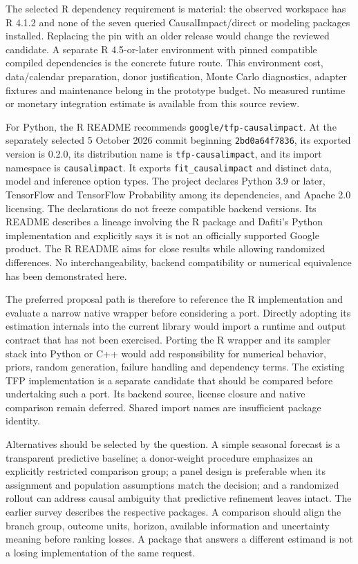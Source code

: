 The selected R dependency requirement is material: the observed workspace
has R 4.1.2 and none of the seven queried CausalImpact/direct or modeling
packages installed. Replacing the pin with an older release would change
the reviewed candidate. A separate R 4.5-or-later environment with pinned
compatible compiled dependencies is the concrete future route. This
environment cost, data/calendar preparation, donor justification, Monte
Carlo diagnostics, adapter fixtures and maintenance belong in the prototype
budget. No measured runtime or monetary integration estimate is available
from this source review. \citep{exec13_ci_reuse,exec13_ci_dependencies}

For Python, the R README recommends \texttt{google/tfp-causalimpact}.
At the separately selected 5 October 2026 commit beginning
\texttt{2bd0a64f7836}, its exported version is 0.2.0, its distribution name
is \texttt{tfp-causalimpact}, and its import namespace is
\texttt{causalimpact}. It exports \texttt{fit\_causalimpact} and distinct
data, model and inference option types. The project declares Python 3.9 or
later, TensorFlow and TensorFlow Probability among its dependencies, and
Apache 2.0 licensing. The declarations do not freeze compatible backend
versions. Its README describes a lineage involving the R package and Dafiti's
Python implementation and explicitly says it is not an officially supported
Google product. The R README aims for close results while allowing
randomized differences. No interchangeability, backend compatibility or
numerical equivalence has been demonstrated here.
\citep{exec13_ci_python,exec13_ci_r}

The preferred proposal path is therefore to reference the R implementation
and evaluate a narrow native wrapper before considering a port. Directly
adopting its estimation internals into the current library would import a
runtime and output contract that has not been exercised. Porting the R
wrapper and its sampler stack into Python or C++ would add responsibility
for numerical behavior, priors, random generation, failure handling and
dependency terms. The existing TFP implementation is a separate candidate
that should be compared before undertaking such a port. Its backend source,
license closure and native comparison remain deferred. Shared import names
are insufficient package identity. \citep{exec13_ci_reuse,exec13_ci_python}

Alternatives should be selected by the question. A simple seasonal forecast
is a transparent predictive baseline; a donor-weight procedure emphasizes
an explicitly restricted comparison group; a panel design is preferable
when its assignment and population assumptions match the decision; and a
randomized rollout can address causal ambiguity that predictive refinement
leaves intact. The earlier survey describes the respective packages. A
comparison should align the branch group, outcome units, horizon, available
information and uncertainty meaning before ranking losses. A package that
answers a different estimand is not a losing implementation of the same
request.

